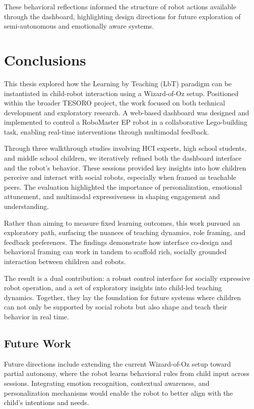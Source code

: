\documentclass[a4paper]{usiinfbachelorproject}
\begin{document}
These behavioral reflections informed the structure of robot actions available through the dashboard, highlighting design directions for future exploration of semi-autonomous and emotionally aware systems.

\newpage

\section{\textbf{Conclusions}}\label{sec:conclusions}
This thesis explored how the Learning by Teaching (LbT) paradigm can be instantiated in child-robot interaction using a Wizard-of-Oz setup.
Positioned within the broader TESORO project, the work focused on both technical development and exploratory research.
A web-based dashboard was designed and implemented to control a RoboMaster EP robot in a collaborative Lego-building task, enabling real-time interventions through multimodal feedback.

Through three walkthrough studies involving HCI experts, high school students, and middle school children, we iteratively refined both the dashboard interface and the robot's behavior.
These sessions provided key insights into how children perceive and interact with social robots, especially when framed as teachable peers.
The evaluation highlighted the importance of personalization, emotional attunement, and multimodal expressiveness in shaping engagement and understanding.

Rather than aiming to measure fixed learning outcomes, this work pursued an exploratory path, surfacing the nuances of teaching dynamics, role framing, and feedback preferences.
The findings demonstrate how interface co-design and behavioral framing can work in tandem to scaffold rich, socially grounded interaction between children and robots.

The result is a dual contribution: a robust control interface for socially expressive robot operation, and a set of exploratory insights into child-led teaching dynamics.
Together, they lay the foundation for future systems where children can not only be supported by social robots but also shape and teach their behavior in real time.

\subsection{\textbf{Future Work}}
Future directions include extending the current Wizard-of-Oz setup toward partial autonomy, where the robot learns behavioral rules from child input across sessions.
Integrating emotion recognition, contextual awareness, and personalization mechanisms would enable the robot to better align with the child's intentions and needs.
\end{document}
